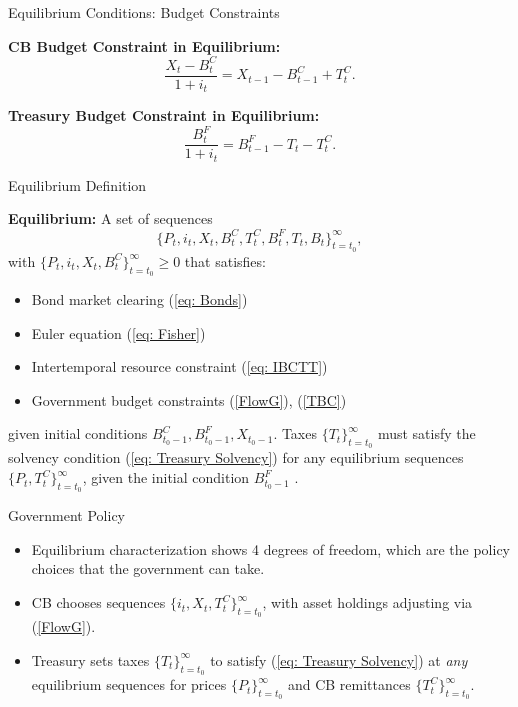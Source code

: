 \documentclass[11pt,aspectratio=169]{beamer}
\begin{document}
\begin{frame}{Equilibrium Conditions: Budget Constraints}

\vspace{0.35cm}
\noindent\textbf{CB Budget Constraint in Equilibrium:}
\begin{equation}
\frac{X_{t}-B_{t}^{C}}{1+i_{t}} = X_{t-1} - B_{t-1}^{C} + T_{t}^{C} 
.\label{FlowG}
\end{equation}
\vspace{0.5cm}

\noindent\textbf{Treasury Budget Constraint in Equilibrium:}
\begin{equation}
\frac{B_{t}^{F}}{1+i_{t}} = B_{t-1}^{F} - T_{t} - T_{t}^{C}.  
\label{TBC}
\end{equation}

\end{frame}

\begin{frame}{Equilibrium Definition}

\textbf{Equilibrium:}  
A set of sequences 
\[
\{ P_t, i_t, X_t, B_t^C, T_t^C, B_t^F, T_t, B_t \}_{t=t_0}^\infty,
\]
with $\{ P_t, i_t, X_t, B_t^C \}_{t=t_0}^\infty \geq 0$ that satisfies:
\begin{itemize}
  \item Bond market clearing (\ref{eq: Bonds})
  \item Euler equation (\ref{eq: Fisher})
  \item Intertemporal resource constraint (\ref{eq: IBCTT})
  \item Government budget constraints (\ref{FlowG}), (\ref{TBC})
\end{itemize}

given initial conditions $B_{t_0-1}^C, B_{t_0-1}^F, X_{t_0-1}$.  
Taxes $\{T_t\}_{t=t_0}^\infty$ must satisfy the solvency condition (\ref{eq: Treasury Solvency}) for any equilibrium sequences $\{P_t,T_t^C\}_{t=t_0}^\infty$, given the initial condition $B_{t_0-1}^F$ .
\end{frame}
\begin{frame}{Government Policy}
\begin{itemize}
\item Equilibrium characterization shows 4 degrees of freedom, which are the policy choices that the government can take.
  \vspace{0.3cm}
  \item CB chooses sequences $\{ i_t, X_t, T_t^C \}_{t=t_0}^\infty$, with asset holdings adjusting via (\ref{FlowG}).
\vspace{0.3cm}
\item Treasury sets taxes $\{T_t\}_{t=t_0}^\infty$ to satisfy (\ref{eq: Treasury Solvency}) at \emph{any} equilibrium sequences for prices $\{P_t\}_{t=t_0}^\infty$ and CB remittances $\{T_t^C\}_{t=t_0}^\infty.$
\end{itemize}
\end{frame}
\end{document}

